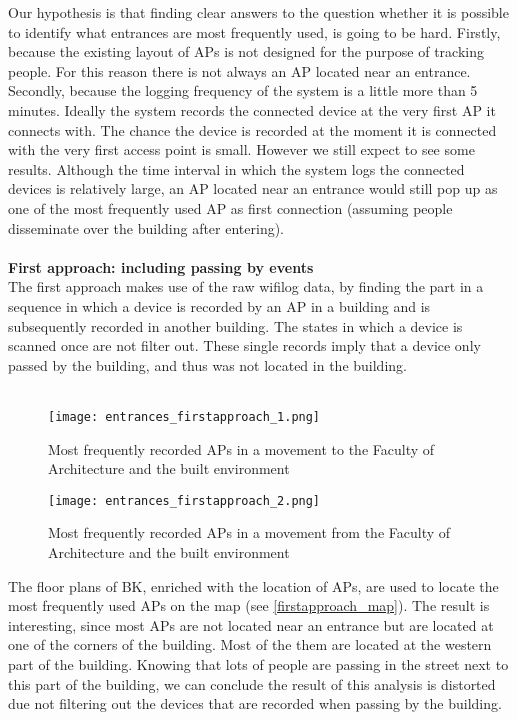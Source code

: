 Our hypothesis is that finding clear answers to the question whether it is possible to identify what entrances are most frequently used, is going to be hard. Firstly, because the existing layout of APs is not designed for the purpose of tracking people. For this reason there is not always an AP located near an entrance. Secondly, because the logging frequency of the system is a little more than 5 minutes. Ideally the system records the connected device at the very first AP it connects with. The chance the device is recorded at the moment it is connected with the very first access point is small. However we still expect to see some results. Although the time interval in which the system logs the connected devices is relatively large, an AP located near an entrance would still pop up as one of the most frequently used AP as first connection (assuming people disseminate over the building after entering). \\\\
\textbf{First approach: including passing by events}\\
The first approach makes use of the raw wifilog data, by finding the part in a sequence in which a device is recorded by an AP in a building and is subsequently recorded in another building. The states in which a device is scanned once are not filter out. These single records imply that a device only passed by the building, and thus was not located in the building. \\\\
\begin{figure}[H]
	\centering
	\texttt{[image: entrances\_firstapproach\_1.png]}
	\captionsetup{justification=centering}
	\caption{Most frequently recorded APs in a movement to the Faculty of Architecture and the built environment}
	\label{firstapproach_graph_1}
\end{figure}
\begin{figure}[H]
	\centering
	\texttt{[image: entrances\_firstapproach\_2.png]}
	\captionsetup{justification=centering}
	\caption{Most frequently recorded APs in a movement from the Faculty of Architecture and the built environment}
	\label{firstapproach_graph_2}
\end{figure}
The floor plans of BK, enriched with the location of APs, are used to locate the most frequently used APs on the map (see \autoref{firstapproach_map}). The result is interesting, since most APs are not located near an entrance but are located at one of the corners of the building. Most of the them are located at the western part of the building. Knowing that lots of people are passing in the street next to this part of the building, we can conclude the result of this analysis is distorted due not filtering out the devices that are recorded when passing by the building.\\\\

